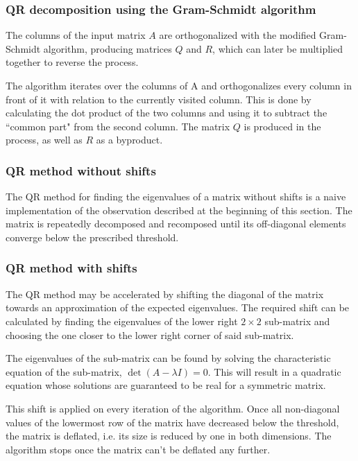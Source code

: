 \documentclass{article}
\begin{document}
	\subsubsection{QR decomposition using the Gram-Schmidt algorithm}

	The columns of the input matrix $A$ are orthogonalized with the modified
	Gram-Schmidt algorithm, producing matrices $Q$ and $R$, which can later be
	multiplied together to reverse the process.

	The algorithm iterates over the columns of A and orthogonalizes every column
	in front of it with relation to the currently visited column. This is done
	by calculating the dot product of the two columns and using it to subtract
	the ``common part" from the second column. The matrix $Q$ is produced in the
	process, as well as $R$ as a byproduct.

	\subsubsection{QR method without shifts}

	The QR method for finding the eigenvalues of a matrix without shifts is a
	naive implementation of the observation described at the beginning of this
	section. The matrix is repeatedly decomposed and recomposed until its
	off-diagonal elements converge below the prescribed threshold.

	\subsubsection{QR method with shifts}

	The QR method may be accelerated by shifting the diagonal of the matrix
	towards an approximation of the expected eigenvalues. The required shift can
	be calculated by finding the eigenvalues of the lower right $2 \times 2$
	sub-matrix and choosing the one closer to the lower right corner of said
	sub-matrix.

	The eigenvalues of the sub-matrix can be found by solving the characteristic
	equation of the sub-matrix, $\det{(A - \lambda I)} = 0$. This will result in
	a quadratic equation whose solutions are guaranteed to be real for a
	symmetric matrix.

	This shift is applied on every iteration of the algorithm. Once all
	non-diagonal values of the lowermost row of the matrix have decreased below
	the threshold, the matrix is deflated, i.e. its size is reduced by one in
	both dimensions. The algorithm stops once the matrix can't be deflated any
	further.
\end{document}
